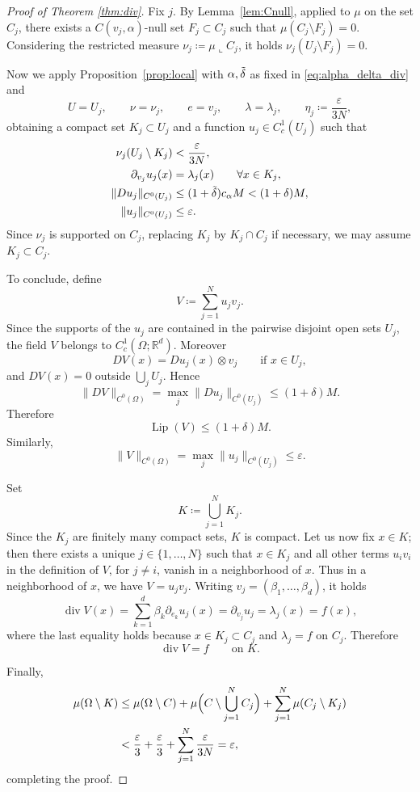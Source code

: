 \documentclass[11pt,a4paper]{article}
\newcommand{\R}{\mathbb{R}}
\newcommand{\diver}{\operatorname{div}}
\newcommand{\Lip}{\operatorname{Lip}}
\theoremstyle{definition}
\theoremstyle{remark}
\begin{document}
\begin{proof}[Proof of Theorem \ref{thm:div}]
Fix $j$.
By Lemma~\ref{lem:Cnull}, applied to $\mu$ on the set $C_j$, there exists a $C(v_j,\alpha)$-null set $F_j \subset C_j$ such that $\mu(C_j \setminus F_j)=0$. Considering the restricted measure $\nu_j\coloneqq \mu\llcorner C_j$, it holds $\nu_j(U_j\setminus F_j)=0$.

Now we apply Proposition~\ref{prop:local} with $\alpha,\Tilde{\delta}$ as fixed in \eqref{eq:alpha_delta_div} and
$$
U=U_j,\qquad \nu=\nu_j,\qquad e=v_j,
\qquad \lambda=\lambda_j,
\qquad
\eta_j\coloneqq \frac{\varepsilon}{3N},
$$
obtaining a compact set $K_j\subset U_j$ and a function $u_j\in C^1_c(U_j)$ such that
\begin{align*}
\nu_j(U_j\setminus K_j)&<\frac{\varepsilon}{3N},\\
\partial_{v_j}u_j(x)&=\lambda_j(x)\qquad \forall x\in K_j,\\
\|Du_j\|_{C^0(U_j)}&\le (1+\Tilde{\delta})c_\alpha M < (1+\delta)M,\\
\|u_j\|_{C^0(U_j)}&\le \varepsilon.
\end{align*}
Since $\nu_j$ is supported on $C_j$, replacing $K_j$ by $K_j\cap C_j$ if necessary, we may assume $K_j\subset C_j$.

To conclude, define
$$
V\coloneqq \sum_{j=1}^N u_j v_j.
$$
Since the supports of the $u_j$ are contained in the pairwise disjoint open sets $U_j$, the field $V$ belongs to $C^1_c(\Omega;\R^d)$.
Moreover
$$
DV(x)=Du_j(x)\otimes v_j
\qquad\text{if }x\in U_j,
$$
and $DV(x)=0$ outside $\bigcup_j U_j$.
Hence
$$
\|DV\|_{C^0(\Omega)}
=\max_j \|Du_j\|_{C^0(U_j)}
\leq (1+\delta) M.
$$
Therefore
$$
\Lip(V)\le (1+\delta) M.
$$
Similarly,
$$
\|V\|_{C^0(\Omega)}
=\max_j \|u_j\|_{C^0(U_j)}
\le \varepsilon.
$$

Set
$$
K\coloneqq \bigcup_{j=1}^N K_j.
$$
Since the $K_j$ are finitely many compact sets, $K$ is compact. Let us now fix $x \in K$; then there exists a unique $j \in \{1,\dots,N\}$ such that $x \in K_j$ and all other terms $u_i v_i$ in the definition of $V$, for $j \neq i$, vanish in a neighborhood of $x$.
Thus in a neighborhood of $x$, we have $V=u_j v_j$.
Writing $v_j=(\beta_1,\dots,\beta_d)$, it holds
$$
\diver V(x)=\sum_{k=1}^d \beta_k\partial_{e_k}u_j(x)= \partial_{v_j} u_j=\lambda_j(x)=f(x),
$$
where the last equality holds
because $x\in K_j\subset C_j$ and $\lambda_j=f$ on $C_j$.
Therefore
$$
\diver V=f
\qquad\text{on }K.
$$

Finally,
\begin{align*}
\mu(\Omega\setminus K)
&\le \mu(\Omega\setminus C)
+\mu\Bigl(C\setminus \bigcup_{j=1}^N C_j\Bigr)
+\sum_{j=1}^N \mu(C_j\setminus K_j)\\
&< \frac{\varepsilon}{3}+\frac{\varepsilon}{3}+\sum_{j=1}^N \frac{\varepsilon}{3N}
=\varepsilon,
\end{align*}
completing the proof.
\end{proof}
\end{document}
